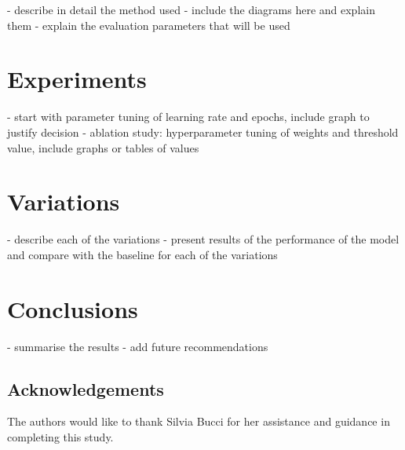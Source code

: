 \documentclass[10pt,twocolumn,letterpaper]{article}
\begin{document}
- describe in detail the method used
- include the diagrams here and explain them
- explain the evaluation parameters that will be used

\section{Experiments}
\label{sec:experiments}

- start with parameter tuning of learning rate and epochs, include graph to justify decision
- ablation study: hyperparameter tuning of weights and threshold value, include graphs or tables of values


\section{Variations}
\label{sec:variations}

- describe each of the variations
- present results of the performance of the model and compare with the baseline for each of the variations

\section{Conclusions}
\label{sec:conclusion}

- summarise the results
- add future recommendations

\subsection{Acknowledgements}
The authors would like to thank Silvia Bucci for her assistance and guidance in completing this study.


{\small

%
}
\end{document}
